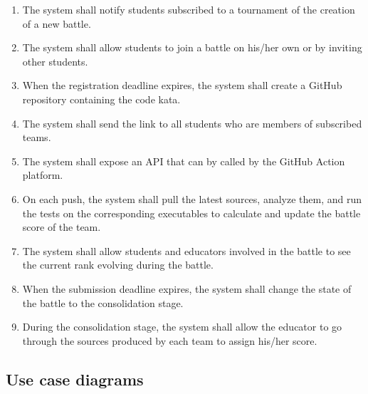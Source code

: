 \begin{enumerate}[label=\textbf{R\arabic*}:,leftmargin=1.3cm]
\begin{enumerate}[label=\textbf{R\arabic{enumi}.\arabic*}:, leftmargin=*]
          \end{enumerate}
    \item The system shall notify students subscribed to a tournament of the creation of a new battle.
    \item The system shall allow students to join a battle on his/her own or by inviting other students. %
    \item When the registration deadline expires, the system shall create a GitHub repository containing the code kata.
    \item The system shall send the link to all students who are members of subscribed teams.
    \item The system shall expose an API that can by called by the GitHub Action platform.
    \item On each push, the system shall pull the latest sources, analyze them, and run the tests on the corresponding executables to calculate and update the battle score of the team. %
    \item The system shall allow students and educators involved in the battle to see the current rank evolving during the battle.
    \item When the submission deadline expires, the system shall change the state of the battle to the consolidation stage.
    \item During the consolidation stage, the system shall allow the educator to go through the sources produced by each team to assign his/her score.
\end{enumerate}
\subsection{Use case diagrams}
